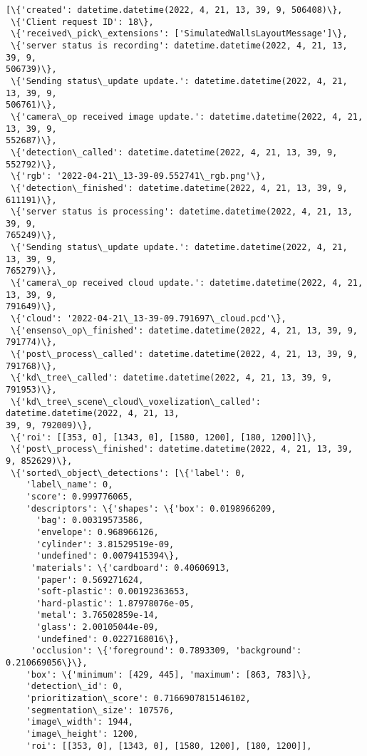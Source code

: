 \documentclass[11pt]{article}
\makeatletter
\newcommand{\boxspacing}{\kern\kvtcb@left@rule\kern\kvtcb@boxsep}
\newcommand{\prompt}[4]{
        {\ttfamily\llap{{\color{#2}[#3]:\hspace{3pt}#4}}\vspace{-\baselineskip}}
    }
\makeatother
\begin{document}
            \begin{tcolorbox}[breakable, size=fbox, boxrule=.5pt, pad at break*=1mm, opacityfill=0]
\prompt{Out}{outcolor}{7}{\boxspacing}
\begin{Verbatim}[commandchars=\\\{\}]
[\{'created': datetime.datetime(2022, 4, 21, 13, 39, 9, 506408)\},
 \{'Client request ID': 18\},
 \{'received\_pick\_extensions': ['SimulatedWallsLayoutMessage']\},
 \{'server status is recording': datetime.datetime(2022, 4, 21, 13, 39, 9,
506739)\},
 \{'Sending status\_update update.': datetime.datetime(2022, 4, 21, 13, 39, 9,
506761)\},
 \{'camera\_op received image update.': datetime.datetime(2022, 4, 21, 13, 39, 9,
552687)\},
 \{'detection\_called': datetime.datetime(2022, 4, 21, 13, 39, 9, 552792)\},
 \{'rgb': '2022-04-21\_13-39-09.552741\_rgb.png'\},
 \{'detection\_finished': datetime.datetime(2022, 4, 21, 13, 39, 9, 611191)\},
 \{'server status is processing': datetime.datetime(2022, 4, 21, 13, 39, 9,
765249)\},
 \{'Sending status\_update update.': datetime.datetime(2022, 4, 21, 13, 39, 9,
765279)\},
 \{'camera\_op received cloud update.': datetime.datetime(2022, 4, 21, 13, 39, 9,
791649)\},
 \{'cloud': '2022-04-21\_13-39-09.791697\_cloud.pcd'\},
 \{'ensenso\_op\_finished': datetime.datetime(2022, 4, 21, 13, 39, 9, 791774)\},
 \{'post\_process\_called': datetime.datetime(2022, 4, 21, 13, 39, 9, 791768)\},
 \{'kd\_tree\_called': datetime.datetime(2022, 4, 21, 13, 39, 9, 791953)\},
 \{'kd\_tree\_scene\_cloud\_voxelization\_called': datetime.datetime(2022, 4, 21, 13,
39, 9, 792009)\},
 \{'roi': [[353, 0], [1343, 0], [1580, 1200], [180, 1200]]\},
 \{'post\_process\_finished': datetime.datetime(2022, 4, 21, 13, 39, 9, 852629)\},
 \{'sorted\_object\_detections': [\{'label': 0,
    'label\_name': 0,
    'score': 0.999776065,
    'descriptors': \{'shapes': \{'box': 0.0198966209,
      'bag': 0.00319573586,
      'envelope': 0.968966126,
      'cylinder': 3.81529519e-09,
      'undefined': 0.0079415394\},
     'materials': \{'cardboard': 0.40606913,
      'paper': 0.569271624,
      'soft-plastic': 0.00192363653,
      'hard-plastic': 1.87978076e-05,
      'metal': 3.76502859e-14,
      'glass': 2.00105044e-09,
      'undefined': 0.0227168016\},
     'occlusion': \{'foreground': 0.7893309, 'background': 0.210669056\}\},
    'box': \{'minimum': [429, 445], 'maximum': [863, 783]\},
    'detection\_id': 0,
    'prioritization\_score': 0.7166907815146102,
    'segmentation\_size': 107576,
    'image\_width': 1944,
    'image\_height': 1200,
    'roi': [[353, 0], [1343, 0], [1580, 1200], [180, 1200]],

\end{Verbatim}
\end{tcolorbox}
\end{document}
